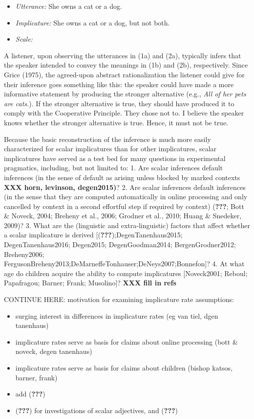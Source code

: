 \documentclass[floatsintext,man]{apa6}
\providecommand{\tightlist}{%
  \setlength{\itemsep}{0pt}\setlength{\parskip}{0pt}}
\theoremstyle{definition}
\theoremstyle{definition}
\theoremstyle{definition}
\theoremstyle{remark}
\begin{document}
\begin{itemize}
\tightlist
\item
  \emph{Utterance:} She owns a cat or a dog.
\item
  \emph{Implicature:} She owns a cat or a dog, but not both.
\item
  \emph{Scale:} 
\end{itemize}

A listener, upon observing the utterances in (1a) and (2a), typically
infers that the speaker intended to convey the meanings in (1b) and
(2b), respectively. Since Grice (1975), the agreed-upon abstract
rationalization the listener could give for their inference goes
something like this: the speaker could have made a more informative
statement by producing the stronger alternative (e.g., \emph{All of her
pets are cats.}). If the stronger alternative is true, they should have
produced it to comply with the Cooperative Principle. They chose not to.
I believe the speaker knows whether the stronger alternative is true.
Hence, it must not be true.

Because the basic reconstruction of the inference is much more easily
characterized for scalar implicatures than for other implicatures,
scalar implicatures have served as a test bed for many questions in
experimental pragmatics, including, but not limited to: 1. Are scalar
inferences default inferences (in the sense of default as arising unless
blocked by marked contexts \textbf{XXX horn, levinson, degen2015)}? 2.
Are scalar inferences default inferences (in the sense that they are
computed automatically in online processing and only cancelled by
context in a second effortful step if required by context)
({\textbf{???}}; Bott \& Noveck, 2004; Breheny et al., 2006; Grodner et
al., 2010; Huang \& Snedeker, 2009)? 3. What are the (linguistic and
extra-linguistic) factors that affect whether a scalar implicature is
derived {[}({\textbf{???}});DegenTanenhaus2015; DegenTanenhaus2016;
Degen2015; DegenGoodman2014; BergenGrodner2012; Breheny2006;
FergusonBreheny2013;DeMarneffeTonhauser;DeNeys2007;Bonnefon{]}? 4. At
what age do children acquire the ability to compute implicatures
{[}Noveck2001; Reboul; Papafragou; Barner; Frank; Musolino{]}?
\textbf{XXX fill in refs}

CONTINUE HERE: motivation for examining implicature rate assumptions:

\begin{itemize}
\item
  surging interest in differences in implicature rates (eg van tiel,
  dgen tanenhaus)
\item
  implicature rates serve as basis for claims about online processing
  (bott \& noveck, degen tanenhaus)
\item
  implicature rates serve as basis for claims about children (bishop
  katsos, barner, frank)
\item
  add ({\textbf{???}})
\item
  ({\textbf{???}}) for investigations of scalar adjectives, and
  ({\textbf{???}})
\end{itemize}
\end{document}
